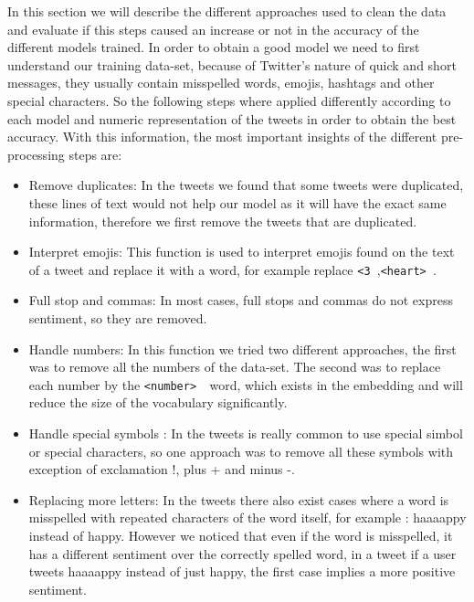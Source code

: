 \documentclass[10pt,conference,compsocconf]{IEEEtran}
\begin{document}
In this section we will describe the different approaches used to clean the data and evaluate if this steps caused an increase or not in the accuracy of the different models trained.
In order to obtain a good model we need to first understand our training data-set, because of Twitter's nature of quick and short messages, they usually contain misspelled words, emojis, hashtags and other special characters. So the following steps where applied differently according to each model and numeric representation of the tweets in order to obtain the best accuracy.
With this information, the most important insights of the different pre-processing steps are:
\begin{itemize}

\item Remove duplicates: In the tweets we found that some tweets were duplicated, these lines of text would not help our model as it will have the exact same information, therefore we first remove the tweets that are duplicated.

\item Interpret emojis: This function is used to interpret emojis found on the text of a tweet and replace it with a word, for example replace  \texttt{<3\,},\texttt{<heart>\,}.

\item Full stop and commas: In most cases, full stops and commas do not express sentiment, so they are removed.

\item Handle numbers: In this function we tried two different approaches, the first was to remove all the numbers of the data-set. The second was to replace each number by the \texttt{<number> \,}word, which exists in the embedding and will reduce the size of the vocabulary significantly.

\item Handle special symbols : In the tweets is really common to use special simbol or special characters, so one approach was to remove all these symbols with exception of exclamation !, plus + and minus -.

\item Replacing more letters: In the tweets there also exist cases where a word is misspelled with repeated characters of the word itself, for example : haaaappy instead of happy. However we noticed that even if the word is misspelled, it has a different sentiment over the correctly spelled word, in a tweet if a user tweets haaaappy instead of just happy, the first case implies a more positive sentiment. 


\end{itemize}
\end{document}
